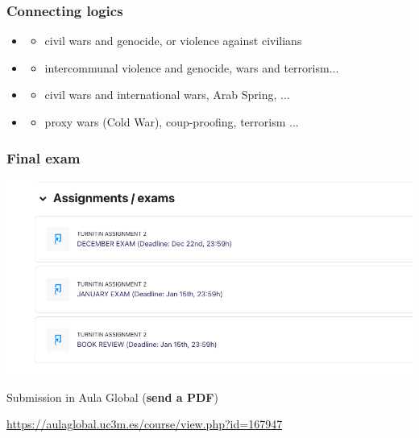 \documentclass[aspectratio=43]{beamer}
\begin{document}
\begin{frame}
\frametitle{Connecting logics}
\centering

\begin{itemize}
  \item {}
  \begin{itemize}
    \item civil wars and genocide, or violence against civilians
  \end{itemize}
  \item<2-> 
  \begin{itemize}
    \item intercommunal violence and genocide, wars and terrorism...
  \end{itemize}
  \item<3-> 
  \begin{itemize}
    \item civil wars and international wars, Arab Spring, ...
  \end{itemize}
  \item<4-> 
  \begin{itemize}
    \item proxy wars (Cold War), coup-proofing, terrorism ...
  \end{itemize}
\end{itemize}

\end{frame}

\begin{frame}
\frametitle{Final exam}
\centering

\includegraphics[width = \textwidth]{img/ag}

Submission in Aula Global (\textbf{send a PDF})

\url{https://aulaglobal.uc3m.es/course/view.php?id=167947}

\end{frame}
\end{document}
